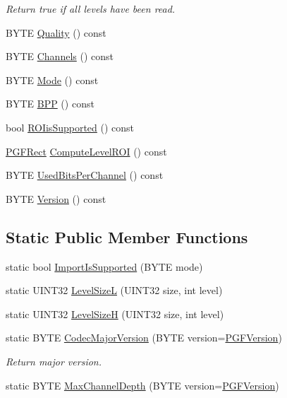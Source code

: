 \begin{DoxyCompactItemize}
\begin{DoxyCompactList}\small\item\em Return true if all levels have been read. \end{DoxyCompactList}\item 
B\+Y\+TE \mbox{\hyperlink{classCPGFImage_a6d8ca06237591aae49d7f25278067c63}{Quality}} () const
\item 
B\+Y\+TE \mbox{\hyperlink{classCPGFImage_af712acd16a3b00d55c03e355939086fc}{Channels}} () const
\item 
B\+Y\+TE \mbox{\hyperlink{classCPGFImage_a8c60aabdcf2556e9a425052e7f5b5d30}{Mode}} () const
\item 
B\+Y\+TE \mbox{\hyperlink{classCPGFImage_ace9320cc25d748d77a7dfee759f01caa}{B\+PP}} () const
\item 
bool \mbox{\hyperlink{classCPGFImage_a9db775cf3a36997b55106fbab7284c14}{R\+O\+Iis\+Supported}} () const
\item 
\mbox{\hyperlink{structPGFRect}{P\+G\+F\+Rect}} \mbox{\hyperlink{classCPGFImage_a6e745b509e9bea4ad35f951f37693fc4}{Compute\+Level\+R\+OI}} () const
\item 
B\+Y\+TE \mbox{\hyperlink{classCPGFImage_a6cc4f75843c3c15f573aaa0131649b10}{Used\+Bits\+Per\+Channel}} () const
\item 
B\+Y\+TE \mbox{\hyperlink{classCPGFImage_aa872f5010f55a3bc696706d259b52051}{Version}} () const
\end{DoxyCompactItemize}
\subsection*{Static Public Member Functions}
\begin{DoxyCompactItemize}
\item 
static bool \mbox{\hyperlink{classCPGFImage_a5c32194271d4e115b8f5c7fdfc1670a5}{Import\+Is\+Supported}} (B\+Y\+TE mode)
\item 
static U\+I\+N\+T32 \mbox{\hyperlink{classCPGFImage_ad7e2f885a059a39ca15a47ecb497833b}{Level\+SizeL}} (U\+I\+N\+T32 size, int level)
\item 
static U\+I\+N\+T32 \mbox{\hyperlink{classCPGFImage_a96e7712f6033810f386a23f2faec0037}{Level\+SizeH}} (U\+I\+N\+T32 size, int level)
\item 
static B\+Y\+TE \mbox{\hyperlink{classCPGFImage_a58e8d626654a10486149146c8cd41d11}{Codec\+Major\+Version}} (B\+Y\+TE version=\mbox{\hyperlink{PGFtypes_8h_aba6dadeb0788b7e02ab3c4425c6ef38a}{P\+G\+F\+Version}})
\begin{DoxyCompactList}\small\item\em Return major version. \end{DoxyCompactList}\item 
static B\+Y\+TE \mbox{\hyperlink{classCPGFImage_a368601b5942e4406cdb87120406ff075}{Max\+Channel\+Depth}} (B\+Y\+TE version=\mbox{\hyperlink{PGFtypes_8h_aba6dadeb0788b7e02ab3c4425c6ef38a}{P\+G\+F\+Version}})
\end{DoxyCompactItemize}
